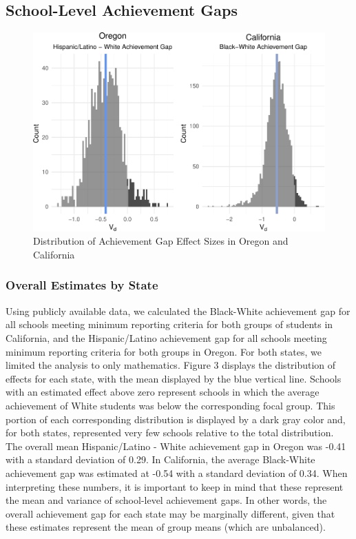 \documentclass[man, fleqn, noextraspace]{apa6}
\theoremstyle{definition}
\theoremstyle{definition}
\theoremstyle{definition}
\theoremstyle{remark}
\begin{document}
\hypertarget{school-level-achievement-gaps}{%
\subsection{School-Level Achievement
Gaps}\label{school-level-achievement-gaps}}

\begin{figure}
\centering
\includegraphics{anderson_ncme18_files/figure-latex/unnamed-chunk-3-1.pdf}
\caption{\label{fig:unnamed-chunk-3}Distribution of Achievement Gap Effect
Sizes in Oregon and California}
\end{figure}

\hypertarget{overall-estimates-by-state}{%
\subsubsection{Overall Estimates by
State}\label{overall-estimates-by-state}}

Using publicly available data, we calculated the Black-White achievement
gap for all schools meeting minimum reporting criteria for both groups
of students in California, and the Hispanic/Latino achievement gap for
all schools meeting minimum reporting criteria for both groups in
Oregon. For both states, we limited the analysis to only mathematics.
Figure 3 displays the distribution of effects for each state, with the
mean displayed by the blue vertical line. Schools with an estimated
effect above zero represent schools in which the average achievement of
White students was below the corresponding focal group. This portion of
each corresponding distribution is displayed by a dark gray color and,
for both states, represented very few schools relative to the total
distribution. The overall mean Hispanic/Latino - White achievement gap
in Oregon was -0.41 with a standard deviation of 0.29. In California,
the average Black-White achievement gap was estimated at -0.54 with a
standard deviation of 0.34. When interpreting these numbers, it is
important to keep in mind that these represent the mean and variance of
school-level achievement gaps. In other words, the overall achievement
gap for each state may be marginally different, given that these
estimates represent the mean of group means (which are unbalanced).
\end{document}
